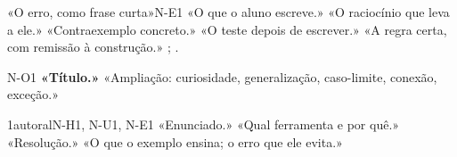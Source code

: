 \ErrosComuns

\begin{erro}{«O erro, como frase curta»}{{{N}}-E1}
 «O que o aluno escreve.»
 «O raciocínio que leva a ele.»
 «Contraexemplo concreto.»
 «O teste depois de escrever.»
 «A regra certa, com remissão à construção.»
 ; .
\end{erro}

\Observacoes

\begin{obs}{{{N}}-O1}
\textbf{«Título.»} «Ampliação: curiosidade, generalização, caso-limite, conexão, exceção.»
\end{obs}

\Exemplos

\begin{exemplo}{}{1}{autoral}{{{N}}-H1, {{N}}-U1, {{N}}-E1}
\label{ex:u{{N}}:nome}
«Enunciado.»
\plano «Qual ferramenta e por quê.»
\resolucao «Resolução.»
\comentario «O que o exemplo ensina; o erro que ele evita.»
\end{exemplo}

\Questoes

